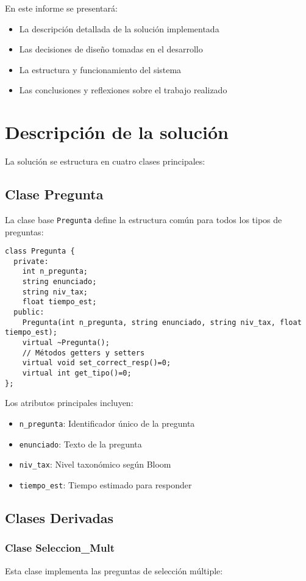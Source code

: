 \documentclass[12pt]{article}
\begin{document}
En este informe se presentar\'a:
\begin{itemize}
    \item La descripci\'on detallada de la soluci\'on implementada
    \item Las decisiones de dise\~no tomadas en el desarrollo
    \item La estructura y funcionamiento del sistema
    \item Las conclusiones y reflexiones sobre el trabajo realizado
\end{itemize}

\section{Descripci\'on de la soluci\'on}
La soluci\'on se estructura en cuatro clases principales:

\subsection{Clase Pregunta}
La clase base \texttt{Pregunta} define la estructura com\'un para todos los tipos de preguntas:

\begin{lstlisting}[style=customc]
class Pregunta {
  private:
    int n_pregunta;
    string enunciado;
    string niv_tax;
    float tiempo_est;
  public:
    Pregunta(int n_pregunta, string enunciado, string niv_tax, float tiempo_est);
    virtual ~Pregunta();
    // Métodos getters y setters
    virtual void set_correct_resp()=0;
    virtual int get_tipo()=0;
};
\end{lstlisting}

Los atributos principales incluyen:
\begin{itemize}
    \item \texttt{n\_pregunta}: Identificador \'unico de la pregunta
    \item \texttt{enunciado}: Texto de la pregunta
    \item \texttt{niv\_tax}: Nivel taxon\'omico seg\'un Bloom
    \item \texttt{tiempo\_est}: Tiempo estimado para responder
\end{itemize}

\subsection{Clases Derivadas}

\subsubsection{Clase Seleccion\_Mult}
Esta clase implementa las preguntas de selecci\'on m\'ultiple:
\end{document}
